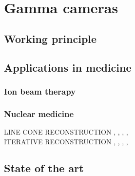\chapter{Gamma cameras}\label{chap::2}

\vfill

\minitoc

\newpage


\section{Working principle}

\section{Applications in medicine}

\subsection{Ion beam therapy}

\subsection{Nuclear medicine}

LINE CONE RECONSTRUCTION \parencite{Cree1994}, \parencite{Basko1998}, \parencite{Parra1999}, \parencite{Hirasawa2003}, \parencite{Maxim2009} \\

ITERATIVE RECONSTRUCTION \parencite{Schone2010}, \parencite{Zoglauer2011}, \parencite{Gillam2011}, \parencite{Lojacono2013}, \parencite{Mackin2012}\\

\section{State of the art}

\clearpage
